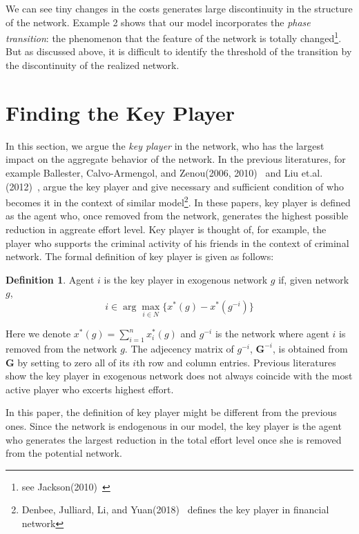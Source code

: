 \documentclass[12pt]{article}
\theoremstyle{definition}
\newtheorem{definition}{Definition}
\begin{document}
We can see tiny changes in the costs generates large discontinuity in the structure of the network.
Example 2 shows that our model incorporates the {\it{phase transition}}: the phenomenon that the feature of the network is totally changed\footnote{see Jackson(2010)~\cite{social}}.
But as discussed above, it is difficult to identify the threshold of the transition by the discontinuity of the realized network.


\section{Finding the Key Player}

In this section, we argue the {\it{key player}} in the network, who has the largest impact on the aggregate behavior of the network.
In the previous literatures, for example Ballester, Calvo-Armengol, and Zenou(2006, 2010)~\cite{whowho, delinquent} and Liu et.al.(2012)~\cite{criminal}, argue the key player and give necessary and sufficient condition of who becomes it in the context of similar model\footnote{Denbee, Julliard, Li, and Yuan(2018)~\cite{denbee} defines the key player in financial network}.
In these papers, key player is defined as the agent who, once removed from the network, generates the highest possible reduction in aggreate effort level.
Key player is thought of, for example, the player who supports the criminal activity of his friends in the context of criminal network.
The formal definition of key player is given as follows:

\begin{definition}
Agent $i$ is the key player in exogenous network $g$ if, given network $g$,
\[ i \in \arg \max_{i \in N} \{ x^*(g) - x^*(g^{-i}) \} \]
\end{definition}

Here we denote $x^*(g) = \sum_{i=1}^n x_i^*(g)$ and $g^{-i}$ is the network where agent $i$ is removed from the network $g$.
The adjecency matrix of $g^{-i}$, $\bm{G}^{-i}$, is obtained from $\bm{G}$ by setting to zero all of its $i$th row and column entries.
Previous literatures show the key player in exogenous network does not always coincide with the most active player who excerts highest effort.

In this paper, the definition of key player might be different from the previous ones.
Since the network is endogenous in our model, the key player is the agent who generates the largest reduction in the total effort level once she is removed from the potential network.
\end{document}
